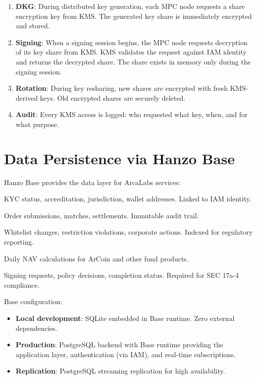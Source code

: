 \documentclass[11pt]{article}
\begin{document}
\begin{enumerate}[leftmargin=1.4em]
    \item \textbf{DKG}: During distributed key generation, each MPC
    node requests a share encryption key from KMS. The generated key
    share is immediately encrypted and stored.
    \item \textbf{Signing}: When a signing session begins, the MPC node
    requests decryption of its key share from KMS. KMS validates the
    request against IAM identity and returns the decrypted share. The
    share exists in memory only during the signing session.
    \item \textbf{Rotation}: During key resharing, new shares are
    encrypted with fresh KMS-derived keys. Old encrypted shares are
    securely deleted.
    \item \textbf{Audit}: Every KMS access is logged: who requested
    what key, when, and for what purpose.
\end{enumerate}

\section{Data Persistence via Hanzo Base}
\label{sec:base}

Hanzo Base provides the data layer for ArcaLabs services:

\begin{description}[leftmargin=1.4em]
    \item[Investor records] KYC status, accreditation, jurisdiction,
    wallet addresses. Linked to IAM identity.
    \item[Trade records] Order submissions, matches, settlements.
    Immutable audit trail.
    \item[Compliance events] Whitelist changes, restriction violations,
    corporate actions. Indexed for regulatory reporting.
    \item[NAV history] Daily NAV calculations for ArCoin and other
    fund products.
    \item[MPC session logs] Signing requests, policy decisions,
    completion status. Required for SEC 17a-4 compliance.
\end{description}

Base configuration:
\begin{itemize}[leftmargin=1.4em]
    \item \textbf{Local development}: SQLite embedded in Base runtime.
    Zero external dependencies.
    \item \textbf{Production}: PostgreSQL backend with Base runtime
    providing the application layer, authentication (via IAM), and
    real-time subscriptions.
    \item \textbf{Replication}: PostgreSQL streaming replication for
    high availability.
\end{itemize}
\end{document}
